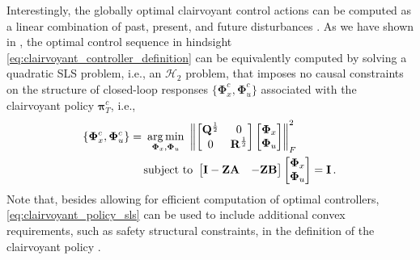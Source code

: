 \documentclass[conference]{IEEEtran}
\DeclareMathOperator*{\st}{subject~to}
\DeclareMathOperator*{\argmin}{arg\,min}
\newcommand{\norm}[1]{\left\lVert#1\right\rVert}
\begin{document}
Interestingly, the globally optimal clairvoyant control actions can be computed as a linear combination of past, present, and future disturbances \cite{hassibi1999indefinite}. As we have shown in \cite[Lem. 2]{martin2022safe}, the optimal control sequence in hindsight \eqref{eq:clairvoyant_controller_definition} can be equivalently computed by solving a quadratic SLS problem, i.e., an $\mathcal{H}_2$ problem, that imposes no causal constraints on the structure of closed-loop responses $\{\bm{\Phi}^c_x, \bm{\Phi}^c_u\}$ associated with the clairvoyant policy $\bm{\pi}^c_T$, i.e.,
\begin{align}
    \hspace{-.25mm}
    \{\bm{\Phi}^c_x, \bm{\Phi}^c_u\} = &~\argmin_{\bm{\Phi}_x, \bm{\Phi}_u} ~ \norm{
    \begin{bmatrix}
        \mathbf{Q}^{\frac{1}{2}} & 0\\
        0 & \mathbf{R}^{\frac{1}{2}}
    \end{bmatrix}
    \begin{bmatrix}
        \bm{\Phi}_x\\\bm{\Phi}_u
    \end{bmatrix}
    }_{F}^2 \label{eq:clairvoyant_policy_sls}\\
    &\st~
    \begin{bmatrix}
        \mathbf{I} - \mathbf{Z} \mathbf{A} & - \mathbf{Z} \mathbf{B}
    \end{bmatrix}
    \begin{bmatrix}
        \bm{\Phi}_x\\\bm{\Phi}_u
    \end{bmatrix} = \mathbf{I} \nonumber\,.
\end{align}
Note that, besides allowing for efficient computation of optimal controllers, \eqref{eq:clairvoyant_policy_sls} can be used to include additional convex requirements, such as safety structural constraints, in the definition of the clairvoyant policy \cite{martin2022safe}.
\end{document}
